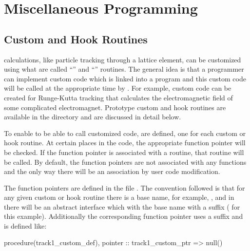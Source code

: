 \chapter{Miscellaneous Programming}

\section{Custom and Hook Routines}
\label{s:custom.hook}

\bmad calculations, like particle tracking through a lattice element, can be customized using what
are called ``'' and ``'' routines. The general idea is that a programmer can
implement custom code which is linked into a program and this custom code will be called at the
appropriate time by \bmad. For example, custom code can be created for Runge-Kutta tracking that
calculates the electromagnetic field of some complicated electromagnet. Prototype custom and hook
routines are available in the  directory and are discussed in detail below.

To enable \bmad to be able to call customized code,  are defined, one for each
custom or hook routine. At certain places in the \bmad code, the appropriate function pointer will
be checked. If the function pointer is associated with a routine, that routine will be called. By
default, the function pointers are not associated with any functions and the only way there will be
an association by user code modification.

The function pointers are defined in the file . The
convention followed is that for any given custom or hook routine there is a base name, for example,
, and in  there will be an abstract interface which
with the base name with a  suffix ( for this example). Additionally
the corresponding function pointer uses a  suffix and is defined like:
\begin{example}
  procedure(track1_custom_def), pointer :: track1_custom_ptr => null()
\end{example}

